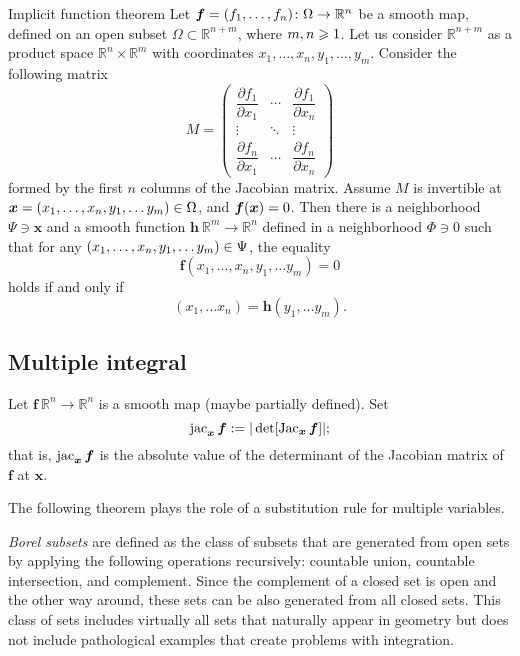\begin{multicols}{2}
{\begin{thm}{Implicit function theorem}\label{thm:imlicit}
Let $\bm{f}\z=(f_1,\dots,f_n)\:\Omega\to\mathbb{R}^n$ be a smooth map, defined on an open subset $\Omega\subset\mathbb{R}^{n+m}$, where
$m,n\z\ge 1$.
Let us consider $\mathbb{R}^{n+m}$ as a product space $\mathbb{R}^n\times \mathbb{R}^m$ with coordinates 
$x_1,\dots,x_n,y_1,\dots,y_m$.
Consider the following matrix 
\[
M=\begin{pmatrix}
\dfrac{\partial f_1}{\partial x_1} & \cdots & \dfrac{\partial f_1}{\partial x_n}\\
\vdots & \ddots & \vdots\\
\dfrac{\partial f_n}{\partial x_1} & \cdots & \dfrac{\partial f_n}{\partial x_n} \end{pmatrix}\]
formed by the first $n$ columns of the Jacobian matrix.
Assume $M$ is invertible at $\bm{x}\z=(x_1,\dots,x_n,y_1,\dots y_m)\in \Omega$, and $\bm{f}(\bm{x})\z=0$.
Then there is a neighborhood $\Psi\ni \bm{x}$
and a smooth function $\bm{h}\:\mathbb{R}^m\to\mathbb{R}^n$ defined in a neighborhood $\Phi\ni 0$ such that
for any $(x_1,\dots,x_n,y_1,\dots y_m)\z\in \Psi$, the equality
\[\bm{f}(x_1,\dots,x_n,y_1,\dots y_m)=0\]
holds if and only if 
\[(x_1,\dots x_n)=\bm{h}(y_1,\dots y_m).\]

\end{thm}

\subsection*{Multiple integral}

Let $\bm{f}\:\mathbb{R}^n\to\mathbb{R}^n$ is a smooth map (maybe partially defined).
Set
\[\jac_{\bm{x}}\bm{f}\df|\det[\Jac_{\bm{x}}\bm{f}]|;
\index{10j@$\jac$ (Jacobian determinant)}\]
that is, $\mathop{\rm jac}\nolimits_{\bm{x}}\bm{f}$ is the absolute value of the determinant of the Jacobian matrix of $\bm{f}$ at $\bm{x}$.

The following theorem plays the role of a substitution rule for multiple variables.

\emph{Borel subsets} are defined as the class of subsets that are generated from open sets by applying the following operations recursively: countable union, countable intersection, and complement.
Since the complement of a closed set is open and the other way around, these sets can be also generated from all closed sets.
This class of sets includes virtually all sets that naturally appear in geometry but does not include pathological examples that create problems with integration.

}
\end{multicols}
